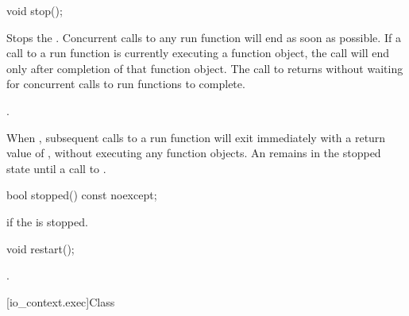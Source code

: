 \begin{itemdecl}
void stop();
\end{itemdecl}

\begin{itemdescr}
\pnum
\effects Stops the . Concurrent calls to any run function will end as soon as possible. If a call to a run function is currently executing a function object, the call will end only after completion of that function object. The call to  returns without waiting for concurrent calls to run functions to complete.

\pnum
\postconditions {}.

\pnum
\enternote When , subsequent calls to a run function will exit immediately with a return value of , without executing any function objects. An  remains in the stopped state until a call to . \exitnote
\end{itemdescr}

\begin{itemdecl}
bool stopped() const noexcept;
\end{itemdecl}

\begin{itemdescr}
\pnum
\returns {} if the  is stopped.
\end{itemdescr}

\begin{itemdecl}
void restart();
\end{itemdecl}

\begin{itemdescr}
\pnum
\postconditions {}.
\end{itemdescr}




[io_context.exec]{Class }

